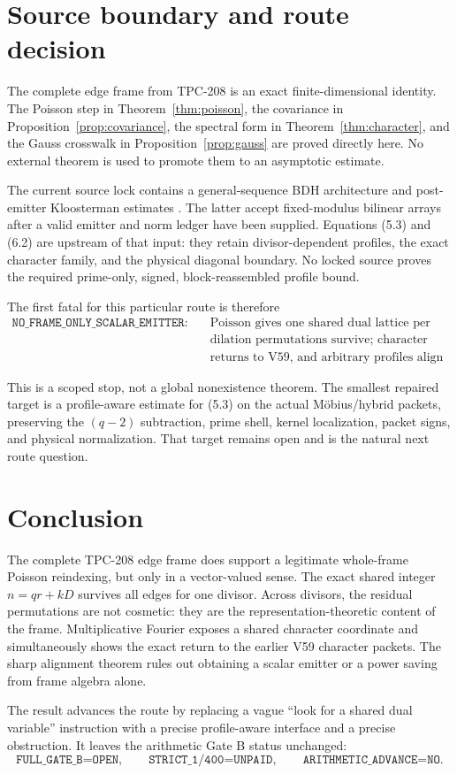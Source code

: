 \documentclass[11pt]{article}
\begin{document}
\section{Source boundary and route decision}

The complete edge frame from TPC-208 is an exact finite-dimensional identity.
The Poisson step in Theorem~\ref{thm:poisson}, the covariance in
Proposition~\ref{prop:covariance}, the spectral form in
Theorem~\ref{thm:character}, and the Gauss crosswalk in
Proposition~\ref{prop:gauss} are proved directly here.  No external theorem
is used to promote them to an asymptotic estimate.

The current source lock contains a general-sequence BDH architecture and
post-emitter Kloosterman estimates \cite{Harper2024,BlomerPascadi2026}.  The
latter accept fixed-modulus bilinear arrays after a valid emitter and norm
ledger have been supplied.  Equations (5.3) and (6.2) are upstream of that
input: they retain divisor-dependent profiles, the exact character family,
and the physical diagonal boundary.  No locked source proves the required
prime-only, signed, block-reassembled profile bound.

The first fatal for this particular route is therefore
\[
\begin{split}
\texttt{NO\_FRAME\_ONLY\_SCALAR\_EMITTER:}
&\quad\text{Poisson gives one shared dual lattice per dilation, but}\\
&\quad\text{dilation permutations survive; character diagonalization}\\
&\quad\text{returns to V59, and arbitrary profiles align sharply.}
\end{split}
\]

This is a scoped stop, not a global nonexistence theorem.  The smallest
repaired target is a profile-aware estimate for (5.3) on the actual
Möbius/hybrid packets, preserving the $(q-2)$ subtraction, prime shell,
kernel localization, packet signs, and physical normalization.  That target
remains open and is the natural next route question.

\section{Conclusion}

The complete TPC-208 edge frame does support a legitimate whole-frame Poisson
reindexing, but only in a vector-valued sense.  The exact shared integer
$n=qr+kD$ survives all edges for one divisor.  Across divisors, the residual
permutations are not cosmetic: they are the representation-theoretic content
of the frame.  Multiplicative Fourier exposes a shared character coordinate
and simultaneously shows the exact return to the earlier V59 character
packets.  The sharp alignment theorem rules out obtaining a scalar emitter or
a power saving from frame algebra alone.

The result advances the route by replacing a vague ``look for a shared dual
variable'' instruction with a precise profile-aware interface and a precise
obstruction.  It leaves the arithmetic Gate B status unchanged:
\[
 \texttt{FULL\_GATE\_B=OPEN},\qquad
 \texttt{STRICT\_1/400=UNPAID},\qquad
 \texttt{ARITHMETIC\_ADVANCE=NO}.
\]



\end{document}
